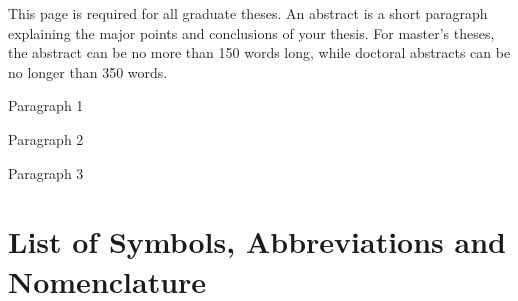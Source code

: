 \documentclass[12pt]{ucalgthes1}
\begin{document}
This page is required for all graduate theses.  An abstract is a short paragraph explaining the major points and conclusions of your thesis.  For master's theses, the abstract can be no more than 150 words long, while doctoral abstracts can be no longer than 350 words.

\newpage
{}
{}
Paragraph 1

Paragraph 2

Paragraph 3

\begin{singlespace}
\newpage
{}
\tableofcontents
\pagestyle{plain}
\newpage
{}
\listoftables
\pagestyle{plain}
\newpage
{}
\listoffigures
\pagestyle{plain}
\clearpage
\clearpage          %
\end{singlespace}
\newpage
{}
\chapter*{\bf{List of Symbols, Abbreviations and Nomenclature}\hfill} 
\listofsymbols
\pagestyle{plain}
\clearpage

\graphicspath{{controlled_study/}}

\appendix
\end{document}
